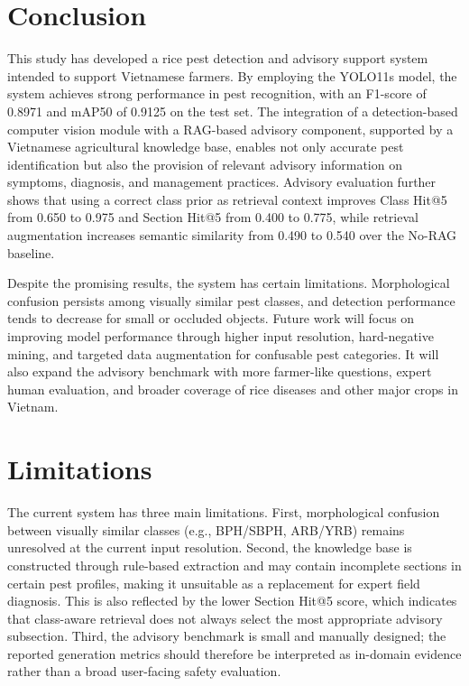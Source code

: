 ﻿\documentclass[11pt]{article}
\begin{document}
\section{Conclusion}

This study has developed a rice pest detection and advisory support system intended to support Vietnamese farmers. By employing the YOLO11s model, the system achieves strong performance in pest recognition, with an F1-score of 0.8971 and mAP50 of 0.9125 on the test set. The integration of a detection-based computer vision module with a RAG-based advisory component, supported by a Vietnamese agricultural knowledge base, enables not only accurate pest identification but also the provision of relevant advisory information on symptoms, diagnosis, and management practices. Advisory evaluation further shows that using a correct class prior as retrieval context improves Class Hit@5 from 0.650 to 0.975 and Section Hit@5 from 0.400 to 0.775, while retrieval augmentation increases semantic similarity from 0.490 to 0.540 over the No-RAG baseline.

Despite the promising results, the system has certain limitations. Morphological confusion persists among visually similar pest classes, and detection performance tends to decrease for small or occluded objects. Future work will focus on improving model performance through higher input resolution, hard-negative mining, and targeted data augmentation for confusable pest categories. It will also expand the advisory benchmark with more farmer-like questions, expert human evaluation, and broader coverage of rice diseases and other major crops in Vietnam.

\section*{Limitations}

The current system has three main limitations. First, morphological confusion between visually similar classes (e.g., BPH/SBPH, ARB/YRB) remains unresolved at the current input resolution. Second, the knowledge base is constructed through rule-based extraction and may contain incomplete sections in certain pest profiles, making it unsuitable as a replacement for expert field diagnosis. This is also reflected by the lower Section Hit@5 score, which indicates that class-aware retrieval does not always select the most appropriate advisory subsection. Third, the advisory benchmark is small and manually designed; the reported generation metrics should therefore be interpreted as in-domain evidence rather than a broad user-facing safety evaluation.
\end{document}

